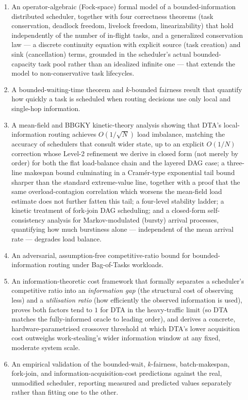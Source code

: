 \documentclass[11pt,a4paper]{report}
\begin{document}
\begin{enumerate}
  \item An operator-algebraic (Fock-space) formal model of a
        bounded-information distributed scheduler, together with four
        correctness theorems (task conservation, deadlock freedom,
        livelock freedom, linearizability) that hold independently of the
        number of in-flight tasks, and a generalized conservation law
        --- a discrete continuity equation with explicit source
        (task creation) and sink (cancellation) terms, grounded in the
        scheduler's actual bounded-capacity task pool rather than an
        idealized infinite one --- that extends the model to
        non-conservative task lifecycles.
  \item A bounded-waiting-time theorem and $k$-bounded fairness result
        that quantify how quickly a task is scheduled when routing
        decisions use only local and single-hop information.
  \item A mean-field and BBGKY kinetic-theory analysis showing that
        DTA's local-information routing achieves $O(1/\sqrt{N})$ load
        imbalance, matching the accuracy of schedulers that consult wider
        state, up to an explicit $O(1/N)$ correction whose Level-2
        refinement we derive in closed form (not merely by order) for
        both the flat load-balance chain and the layered DAG case; a
        three-line makespan bound culminating in a Cram\'er-type
        exponential tail bound sharper than the standard extreme-value
        line, together with a proof that the same overload-contagion
        correlation which worsens the mean-field load estimate does not
        further fatten this tail; a four-level stability ladder; a
        kinetic treatment of fork-join DAG scheduling; and a closed-form
        self-consistency analysis for Markov-modulated (bursty) arrival
        processes, quantifying how much burstiness alone --- independent
        of the mean arrival rate --- degrades load balance.
  \item An adversarial, assumption-free competitive-ratio bound for
        bounded-information routing under Bag-of-Tasks workloads.
  \item An information-theoretic cost framework that formally separates a
        scheduler's competitive ratio into an \emph{information gap}
        (the structural cost of observing less) and a \emph{utilisation
        ratio} (how efficiently the observed information is used), proves
        both factors tend to $1$ for DTA in the heavy-traffic limit (so
        DTA matches the fully-informed oracle to leading order), and
        derives a concrete, hardware-parametrised crossover threshold at
        which DTA's lower acquisition cost outweighs work-stealing's
        wider information window at any fixed, moderate system scale.
  \item An empirical validation of the bounded-wait, $k$-fairness,
        batch-makespan, fork-join, and information-acquisition-cost
        predictions against the real, unmodified scheduler, reporting
        measured and predicted values separately rather than fitting
        one to the other.
\end{enumerate}
\end{document}
